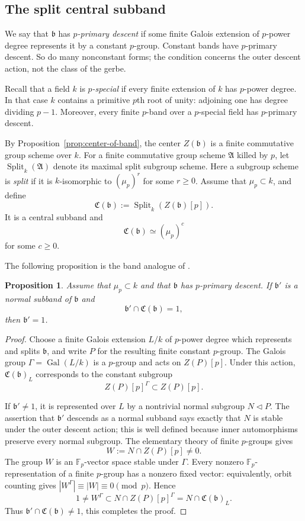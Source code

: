 \documentclass[11pt,reqno]{amsart}
\numberwithin{equation}{section}
\theoremstyle{plain}
\newtheorem{prop}{Proposition}[section]
\theoremstyle{definition}
\def\fA{{\mathfrak A}}
\def\fC{{\mathfrak C}}
\def\Split{{\operatorname{Split}}}
\def\band{{\mathfrak b}}
\begin{document}
\subsection{The split central subband}

We say that $\band$ has \emph{$p$-primary descent} if some finite
Galois extension of $p$-power degree represents it by a constant
$p$-group.  Constant bands have $p$-primary descent.  So do many
nonconstant forms; the condition concerns the outer descent action, not
the class of the gerbe.

Recall that a field $k$ is \emph{$p$-special} if every finite extension of
$k$ has $p$-power degree.  In that case $k$ contains a primitive $p$th root
of unity: adjoining one has degree dividing $p-1$.  Moreover, every finite
$p$-band over a $p$-special field has $p$-primary descent.

By Proposition~\ref{prop:center-of-band}, the center $Z(\band)$ is a finite commutative group scheme over $k$.  For a finite
commutative group scheme $\fA$ killed by $p$, let $\Split_k(\fA)$ denote its
maximal split subgroup scheme.  Here a subgroup scheme is \emph{split} if it
is $k$-isomorphic to $(\mu_p)^r$ for some $r\ge0$.  Assume that
$\mu_p\subset k$, and define
\[
\fC(\band):=\Split_k(Z(\band)[p]).
\]
It is a central subband and
\[
\fC(\band)\simeq(\mu_p)^c
\]
for some $c\ge0$.

The following proposition is the band analogue of
\cite[Lemma~2.1, Theorem~7.1]{LMMRTori}.

\begin{prop}\label{prop:split-central-subband}
Assume that $\mu_p\subset k$ and that $\band$ has $p$-primary
descent.  If $\band'$ is a normal subband of $\band$ and
\[
\band'\cap\fC(\band)=1,
\]
then $\band'=1$.
\end{prop}

\begin{proof}
Choose a finite Galois extension $L/k$ of $p$-power degree which
represents and splits $\band$, and write $P$ for the resulting finite
constant $p$-group.  The Galois group
$\Gamma=\operatorname{Gal}(L/k)$ is a $p$-group and acts on $Z(P)[p]$. Under this action, $\fC(\band)_L$ corresponds to the constant subgroup
\[
Z(P)[p]^\Gamma\subset Z(P)[p].
\]

If $\band'\ne1$, it is represented over $L$ by a nontrivial normal
subgroup $N\triangleleft P$.  The assertion that $\band'$ descends as
a normal subband says exactly that $N$ is stable under the outer descent
action; this is well defined because inner automorphisms preserve every
normal subgroup.
The elementary theory of finite $p$-groups gives
\[
W:=N\cap Z(P)[p]\ne0.
\]
The group $W$ is an $\mathbb F_p$-vector space stable under
$\Gamma$.  Every nonzero $\mathbb F_p$-representation of a finite
$p$-group has a nonzero fixed vector: equivalently, orbit counting gives
$|W^\Gamma|\equiv |W|\equiv0\pmod p$.  Hence
\[
1\ne W^\Gamma
\subset N\cap Z(P)[p]^\Gamma
=N\cap\fC(\band)_L.
\]
Thus $\band'\cap\fC(\band)\ne1$, this completes the proof.
\end{proof}
\end{document}
